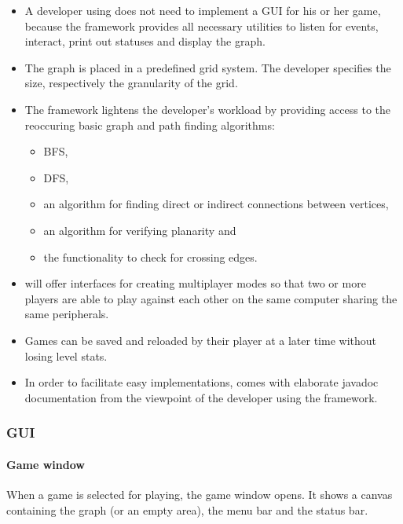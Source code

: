 \begin{itemize}
	\item A \gls{developer} using {\graphioli} does not need to implement a \gls{GUI} for his or her game, because the framework provides all necessary utilities to listen for events, interact, print out statuses and display the graph.

	\item The graph is placed in a predefined grid system. The developer specifies the size, respectively the granularity of the grid.

	\item The framework lightens the developer's workload by providing access to the reoccuring basic graph and \gls{path} finding algorithms:
	\begin{itemize}
		\item \gls{BFS},
		\item \gls{DFS},
		\item an algorithm for finding direct or indirect connections between vertices,
		\item an algorithm for verifying \gls{planarity} and
		\item the functionality to check for crossing edges.
	\end{itemize}

	\item {\graphioli} will offer interfaces for creating multiplayer modes so that two or more \glspl{player} are able to play against each other on the same computer sharing the same peripherals.

	\item Games can be saved and reloaded by their player at a later time without losing \gls{level} stats.

	\item In order to facilitate easy implementations, {\graphioli} comes with elaborate \Gls{javadoc} documentation from the viewpoint of the developer using the framework.

\end{itemize}

\subsubsection{GUI}
\paragraph*{Game window}
When a game is selected for playing, the game window opens. It shows a canvas containing the graph (or an empty area), the menu bar and the status bar.
